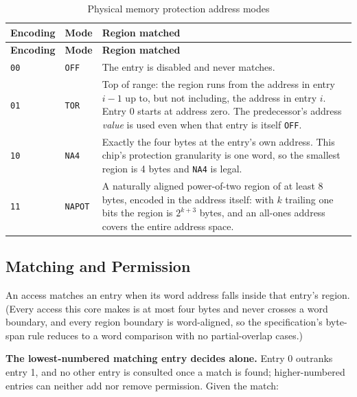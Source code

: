 \begin{longtable}[c]{ l l p{10.2cm} }
\caption{Physical memory protection address modes} \label{t:priv-pmp-modes} \\
\hline \textbf{Encoding} & \textbf{Mode} & \textbf{Region matched} \\ \hline \endfirsthead
\hline \textbf{Encoding} & \textbf{Mode} & \textbf{Region matched} \\ \hline \endhead
\texttt{00} & \texttt{OFF} & The entry is disabled and never matches. \\
\rowcolor{tablehighlightcolor} \texttt{01} & \texttt{TOR} & Top of range: the region runs from the address in entry $i-1$ up to, but not including, the address in entry $i$. Entry 0 starts at address zero. The predecessor's address \textit{value} is used even when that entry is itself \texttt{OFF}. \\
\texttt{10} & \texttt{NA4} & Exactly the four bytes at the entry's own address. This chip's protection granularity is one word, so the smallest region is 4 bytes and \texttt{NA4} is legal. \\
\rowcolor{tablehighlightcolor} \texttt{11} & \texttt{NAPOT} & A naturally aligned power-of-two region of at least 8 bytes, encoded in the address itself: with $k$ trailing one bits the region is $2^{k+3}$ bytes, and an all-ones address covers the entire address space. \\
\hline
\end{longtable}

\subsection{Matching and Permission}

An access matches an entry when its word address falls inside that entry's region. (Every access this core makes is at most four bytes and never crosses a word boundary, and every region boundary is word-aligned, so the specification's byte-span rule reduces to a word comparison with no partial-overlap cases.)

\textbf{The lowest-numbered matching entry decides alone.} Entry 0 outranks entry 1, and no other entry is consulted once a match is found; higher-numbered entries can neither add nor remove permission. Given the match:

